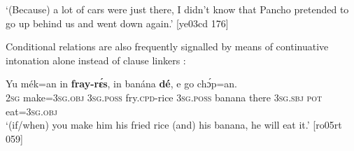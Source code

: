 \glt ‘(Because) a lot of cars were just there, I didn’t know that Pancho pretended to 
go up behind us and went down again.’ [ye03cd 176]
\z

Conditional relations are also frequently signalled by means of continuative intonation alone instead of clause linkers :


\ea%
    \label{ex:key:1539}
    \gll Yu  mék=an    in    \textbf{fray-rɛ́s},    in    banána  \textbf{dé}, 
e    go  chɔ́p=an.\\
\textsc{2sg}  make=\textsc{3sg.obj}  \textsc{3sg.poss}  fry.\textsc{cpd}{}-rice  \textsc{3sg.poss}  banana  there
\textsc{3sg.sbj}  \textsc{pot}  eat=\textsc{3sg.obj}\\

\glt ‘(if/when) you make him his fried rice (and) his banana, he will eat it.’ [ro05rt 059]
\z

